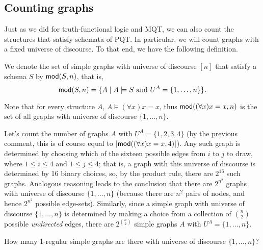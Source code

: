 \subsection*{Counting graphs}

Just as we did for truth-functional logic and MQT, we can also count the structures that satisfy schemata of PQT. In particular, we will count graphs with a fixed universe of discourse. To that end, we have the following definition. 

\begin{definition}
We denote the set of simple graphs with universe of discourse $[n]$  that satisfy a schema $S$ by $\mbox{$\mathsf{mod}(S,n)$}$, that is, \[\mbox{$\mathsf{mod}(S,n)$}=\{A\mid A\models S\mbox{ and }U^A=\{1,\ldots,n\}\}.\] 
\end{definition}

Note that for every structure $A$, $A\models (\forall x)x=x$, thus  $\mbox{$\mathsf{mod}((\forall x)x=x,n)$}$ is the set of all graphs with universe of discourse $\{1,\ldots,n\}$. 

Let's count the number of graphs $A$ with $U^A=\{1,2,3,4\}$ (by the previous comment, this is of course equal to $\mbox{$|\mbox{$\mathsf{mod}((\forall x)x=x,4)$}|$}$). Any such graph is determined by choosing which of the sixteen possible edges from $i$ to $j$ to draw, where $1\leq i\leq 4$ and $1\leq j\leq 4$; that is, a graph with this universe of discourse is determined by 16 binary choices, so, by the product rule, there are $2^{16}$ such graphs. Analogous reasoning leads to the conclusion that there are $2^{n^2}$ graphs with universe of discourse $\{1,\ldots, n\}$ (because there are $n^2$ pairs of nodes, and hence $2^{n^2}$ possible edge-sets). Similarly, since a simple graph with universe of discourse $\{1,\ldots, n\}$ is determined by making a choice from a collection of $\binom{n}{2}$ possible \emph{undirected} edges, there are $2^{\binom{n}{2}}$ simple graphs $A$ with $U^A=\{1,\ldots, n\}$. 

\begin{aside}
    How many 1-regular simple graphs are there with universe of discourse $\{1,\ldots, n\}$? 
\end{aside}